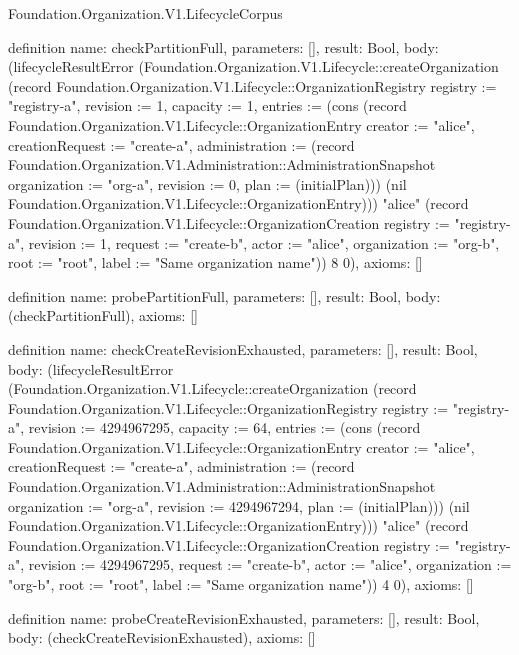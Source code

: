 \begin{lexlean}{Foundation.Organization.V1.LifecycleCorpus}
\begin{semanticmodule}
definition{
  name: checkPartitionFull,
  parameters: [],
  result: Bool,
  body: (lifecycleResultError (Foundation.Organization.V1.Lifecycle::createOrganization (record Foundation.Organization.V1.Lifecycle::OrganizationRegistry {registry := "registry-a", revision := 1, capacity := 1, entries := (cons (record Foundation.Organization.V1.Lifecycle::OrganizationEntry {creator := "alice", creationRequest := "create-a", administration := (record Foundation.Organization.V1.Administration::AdministrationSnapshot {organization := "org-a", revision := 0, plan := (initialPlan)})}) (nil Foundation.Organization.V1.Lifecycle::OrganizationEntry))}) "alice" (record Foundation.Organization.V1.Lifecycle::OrganizationCreation {registry := "registry-a", revision := 1, request := "create-b", actor := "alice", organization := "org-b", root := "root", label := "Same organization name"})) 8 0),
  axioms: []
}

definition{
  name: probePartitionFull,
  parameters: [],
  result: Bool,
  body: (checkPartitionFull),
  axioms: []
}

definition{
  name: checkCreateRevisionExhausted,
  parameters: [],
  result: Bool,
  body: (lifecycleResultError (Foundation.Organization.V1.Lifecycle::createOrganization (record Foundation.Organization.V1.Lifecycle::OrganizationRegistry {registry := "registry-a", revision := 4294967295, capacity := 64, entries := (cons (record Foundation.Organization.V1.Lifecycle::OrganizationEntry {creator := "alice", creationRequest := "create-a", administration := (record Foundation.Organization.V1.Administration::AdministrationSnapshot {organization := "org-a", revision := 4294967294, plan := (initialPlan)})}) (nil Foundation.Organization.V1.Lifecycle::OrganizationEntry))}) "alice" (record Foundation.Organization.V1.Lifecycle::OrganizationCreation {registry := "registry-a", revision := 4294967295, request := "create-b", actor := "alice", organization := "org-b", root := "root", label := "Same organization name"})) 4 0),
  axioms: []
}

definition{
  name: probeCreateRevisionExhausted,
  parameters: [],
  result: Bool,
  body: (checkCreateRevisionExhausted),
  axioms: []
}


\end{semanticmodule}
\end{lexlean}
